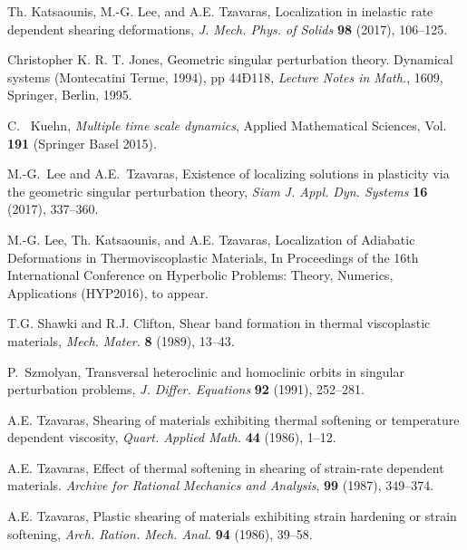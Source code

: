 \documentclass[a4paper,11pt]{article}
\def\blue{\color{blue}}
\theoremstyle{remark}
\begin{document}
\begin{thebibliography}{10}
{\sc Th. Katsaounis, M.-G. Lee, and A.E. Tzavaras},
Localization in inelastic rate dependent shearing deformations,
{\it J. Mech. Phys. of Solids} {\bf 98} (2017), 106--125.

{\blue
{}
{\sc Christopher K. R. T.  Jones}, 
Geometric singular perturbation theory. 
Dynamical systems (Montecatini Terme, 1994), pp 44Ð118, {\it Lecture Notes in Math.}, 1609, Springer, Berlin, 1995.
}

{\sc C.~ Kuehn}, 
{\it Multiple time scale dynamics}, Applied Mathematical Sciences, Vol. {\bf 191} (Springer Basel 2015).

{\sc M.-G.~Lee and A.E.~Tzavaras},
Existence of localizing solutions in plasticity via the geometric singular perturbation theory,
{\it Siam J. Appl. Dyn. Systems} {\bf 16} (2017), 337--360.

{\sc M.-G. Lee, Th. Katsaounis, and A.E. Tzavaras},
Localization of Adiabatic Deformations in Thermoviscoplastic Materials, In Proceedings of the 16th International Conference on Hyperbolic Problems: Theory, Numerics, Applications (HYP2016), to appear.

%
%
%

%
%

{\sc T.G. Shawki and R.J. Clifton},
Shear band formation in thermal viscoplastic materials,
{\it Mech. Mater.}
{\bf 8 } (1989), 13--43.

{\sc P.~Szmolyan},
Transversal heteroclinic and homoclinic orbits in singular perturbation problems,
{\it J. Differ. Equations}
{\bf 92} (1991), 252--281.

{\sc A.E. Tzavaras},
Shearing of materials exhibiting thermal softening or temperature dependent viscosity,
{\em Quart.  Applied Math.} {\bf 44} (1986), 1--12.

{\sc A.E. Tzavaras},
Effect of thermal softening in shearing of strain-rate dependent materials.
{\em Archive for Rational Mechanics and Analysis}, {\bf 99} (1987), 349--374.

{\sc A.E. Tzavaras},
Plastic shearing of materials exhibiting strain hardening or strain softening,
{\it Arch. Ration. Mech. Anal.}
{\bf 94} (1986), 39--58.


\end{thebibliography}
\end{document}
